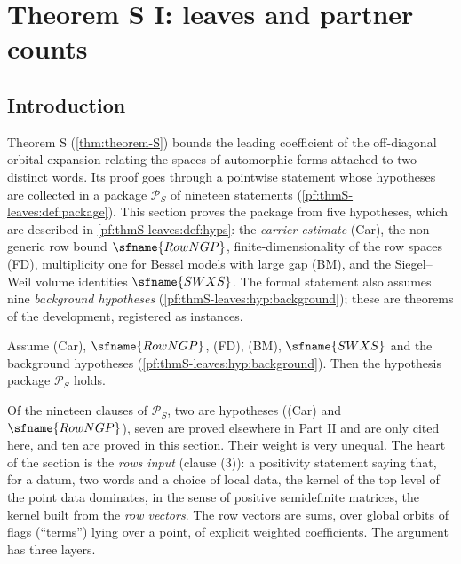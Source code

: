 \section{Theorem S I: leaves and partner counts}\label{sec:pf:thmS-leaves}

\providecommand{\thmSleavesKtop}{K^{\mathrm{top}}}
\providecommand{\thmSleavesBB}{\mathrm{BB}}
\providecommand{\thmSleavesBBG}{\mathrm{BB}^{\mathrm{gl}}}
\providecommand{\thmSleavesCls}{\mathrm{Cls}}
\providecommand{\thmSleavesCok}{\mathrm{Cok}}
\providecommand{\thmSleavesaut}{\mathrm{aut}}
\providecommand{\thmSleavesmod}{\mathrm{mod}}
\providecommand{\thmSleavesdens}{\mathrm{dens}}

\subsection{Introduction}\label{pf:thmS-leaves:intro}

Theorem S (\cref{thm:theorem-S}) bounds the leading coefficient of the off-diagonal orbital expansion
relating the spaces of automorphic forms attached to two distinct words. Its proof goes through a
pointwise statement whose hypotheses are collected in a package $\mathcal P_S$ of nineteen statements
(\cref{pf:thmS-leaves:def:package}). This section proves the package from five hypotheses, which are described in
\cref{pf:thmS-leaves:def:hyps}: the \emph{carrier estimate} (Car), the non-generic row bound $\sfname{RowNGP}$,
finite-dimensionality of the row spaces (FD), multiplicity one for Bessel models with large gap (BM), and the
Siegel--Weil volume identities $\sfname{SWXS}$. The formal statement also assumes nine \emph{background hypotheses}
(\cref{pf:thmS-leaves:hyp:background}); these are theorems of the development, registered as instances.

\begin{theorem}\label{pf:thmS-leaves:main}
Assume \textup{(Car)}, $\sfname{RowNGP}$, \textup{(FD)}, \textup{(BM)}, $\sfname{SWXS}$ and the background hypotheses
(\cref{pf:thmS-leaves:hyp:background}). Then the hypothesis package $\mathcal P_S$ holds.
\end{theorem}

Of the nineteen clauses of $\mathcal P_S$, two are hypotheses ((Car) and $\sfname{RowNGP}$), seven are proved elsewhere in
Part II and are only cited here, and ten are proved in this section. Their weight is very unequal. The heart of the
section is the \emph{rows input} (clause (3)): a positivity statement saying that, for a datum, two words and a choice
of local data, the kernel of the top level of the point data dominates, in the sense of positive semidefinite
matrices, the kernel built from the \emph{row vectors}. The row vectors are sums, over global orbits of flags
(``terms'') lying over a point, of explicit weighted coefficients. The argument has three layers.


